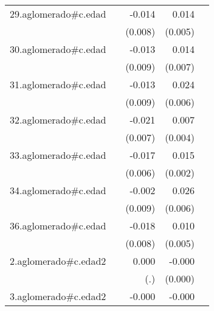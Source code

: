 {\begin{longtable}{l*{4}{D{.}{.}{-1}}}
\addlinespace
29.aglomerado#c.edad&                     &      -0.014         &       0.014\sym{**} &                     \\
            &                     &     (0.008)         &     (0.005)         &                     \\
\addlinespace
30.aglomerado#c.edad&                     &      -0.013         &       0.014\sym{*}  &                     \\
            &                     &     (0.009)         &     (0.007)         &                     \\
\addlinespace
31.aglomerado#c.edad&                     &      -0.013         &       0.024\sym{***}&                     \\
            &                     &     (0.009)         &     (0.006)         &                     \\
\addlinespace
32.aglomerado#c.edad&                     &      -0.021\sym{**} &       0.007         &                     \\
            &                     &     (0.007)         &     (0.004)         &                     \\
\addlinespace
33.aglomerado#c.edad&                     &      -0.017\sym{**} &       0.015\sym{***}&                     \\
            &                     &     (0.006)         &     (0.002)         &                     \\
\addlinespace
34.aglomerado#c.edad&                     &      -0.002         &       0.026\sym{***}&                     \\
            &                     &     (0.009)         &     (0.006)         &                     \\
\addlinespace
36.aglomerado#c.edad&                     &      -0.018\sym{*}  &       0.010\sym{*}  &                     \\
            &                     &     (0.008)         &     (0.005)         &                     \\
\addlinespace
2.aglomerado#c.edad2&                     &       0.000         &      -0.000\sym{**} &                     \\
            &                     &         (.)         &     (0.000)         &                     \\
\addlinespace
3.aglomerado#c.edad2&                     &      -0.000         &      -0.000\sym{***}&                     \\

\end{longtable}}
